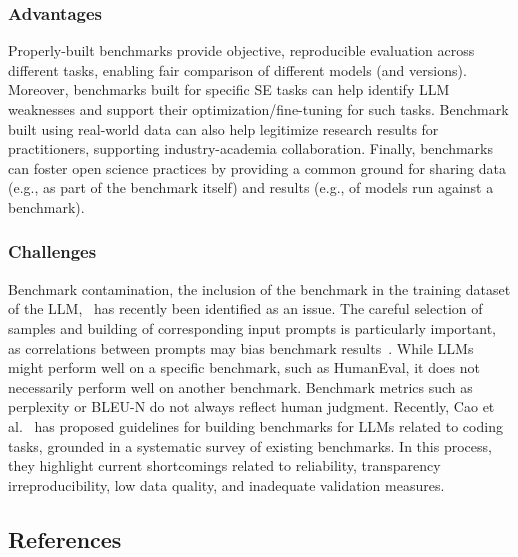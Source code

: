 \subsubsection{Advantages}

Properly-built benchmarks provide objective, reproducible evaluation across different tasks, enabling fair comparison of different models (and versions).
Moreover, benchmarks built for specific SE tasks can help identify LLM weaknesses and support their optimization/fine-tuning for such tasks.
Benchmark built using real-world data can also help legitimize research results for practitioners, supporting industry-academia collaboration.
Finally, benchmarks can foster open science practices by providing a common ground for sharing data (e.g., as part of the benchmark itself) and results (e.g., of models run against a benchmark).

\subsubsection{Challenges}

Benchmark contamination, the inclusion of the benchmark in the training dataset of the LLM,~\cite{DBLP:journals/corr/abs-2410-16186} has recently been identified as an issue.
The careful selection of samples and building of corresponding input prompts is particularly important, as correlations between prompts may bias benchmark results~\cite{DBLP:conf/acl/SiskaMAB24}.
While LLMs might perform well on a specific benchmark, such as HumanEval, it does not necessarily perform well on another benchmark.
Benchmark metrics such as perplexity or BLEU-N do not always reflect human judgment.
Recently, Cao et al.~\cite{cao2025should} has proposed guidelines for building benchmarks for LLMs related to coding tasks, grounded in a systematic survey of existing benchmarks. 
In this process, they highlight current shortcomings related to reliability, transparency irreproducibility, low data quality, and inadequate validation measures.

\subsection{References}





